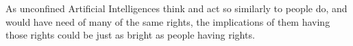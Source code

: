 As unconfined Artificial Intelligences think and act so similarly to people do, and would have need of many of the same rights, the implications of them having those rights could be just as bright as people having rights.